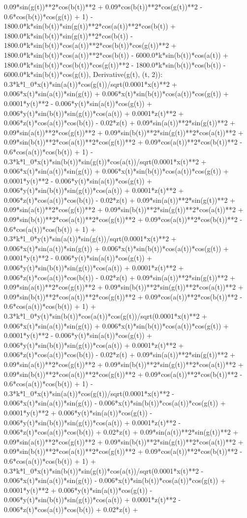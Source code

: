 0.09*sin(g(t))**2*cos(b(t))**2 + 0.09*cos(b(t))**2*cos(g(t))**2 - 0.6*cos(b(t))*cos(g(t)) + 1) - 1800.0*k*sin(b(t))*sin(g(t))**2*cos(a(t))**2*cos(b(t)) + 1800.0*k*sin(b(t))*sin(g(t))**2*cos(b(t)) - 1800.0*k*sin(b(t))*cos(a(t))**2*cos(b(t))*cos(g(t))**2 + 1800.0*k*sin(b(t))*cos(a(t))**2*cos(b(t)) - 6000.0*k*sin(b(t))*cos(a(t)) + 1800.0*k*sin(b(t))*cos(b(t))*cos(g(t))**2 - 1800.0*k*sin(b(t))*cos(b(t)) - 6000.0*k*sin(b(t))*cos(g(t)), Derivative(g(t), (t, 2)): 0.3*k*l_0*x(t)*sin(a(t))*cos(g(t))/sqrt(0.0001*x(t)**2 + 0.006*x(t)*sin(a(t))*sin(g(t)) + 0.006*x(t)*sin(b(t))*cos(a(t))*cos(g(t)) + 0.0001*y(t)**2 - 0.006*y(t)*sin(a(t))*cos(g(t)) + 0.006*y(t)*sin(b(t))*sin(g(t))*cos(a(t)) + 0.0001*z(t)**2 + 0.006*z(t)*cos(a(t))*cos(b(t)) - 0.02*z(t) + 0.09*sin(a(t))**2*sin(g(t))**2 + 0.09*sin(a(t))**2*cos(g(t))**2 + 0.09*sin(b(t))**2*sin(g(t))**2*cos(a(t))**2 + 0.09*sin(b(t))**2*cos(a(t))**2*cos(g(t))**2 + 0.09*cos(a(t))**2*cos(b(t))**2 - 0.6*cos(a(t))*cos(b(t)) + 1) - 0.3*k*l_0*x(t)*sin(b(t))*sin(g(t))*cos(a(t))/sqrt(0.0001*x(t)**2 + 0.006*x(t)*sin(a(t))*sin(g(t)) + 0.006*x(t)*sin(b(t))*cos(a(t))*cos(g(t)) + 0.0001*y(t)**2 - 0.006*y(t)*sin(a(t))*cos(g(t)) + 0.006*y(t)*sin(b(t))*sin(g(t))*cos(a(t)) + 0.0001*z(t)**2 + 0.006*z(t)*cos(a(t))*cos(b(t)) - 0.02*z(t) + 0.09*sin(a(t))**2*sin(g(t))**2 + 0.09*sin(a(t))**2*cos(g(t))**2 + 0.09*sin(b(t))**2*sin(g(t))**2*cos(a(t))**2 + 0.09*sin(b(t))**2*cos(a(t))**2*cos(g(t))**2 + 0.09*cos(a(t))**2*cos(b(t))**2 - 0.6*cos(a(t))*cos(b(t)) + 1) + 0.3*k*l_0*y(t)*sin(a(t))*sin(g(t))/sqrt(0.0001*x(t)**2 + 0.006*x(t)*sin(a(t))*sin(g(t)) + 0.006*x(t)*sin(b(t))*cos(a(t))*cos(g(t)) + 0.0001*y(t)**2 - 0.006*y(t)*sin(a(t))*cos(g(t)) + 0.006*y(t)*sin(b(t))*sin(g(t))*cos(a(t)) + 0.0001*z(t)**2 + 0.006*z(t)*cos(a(t))*cos(b(t)) - 0.02*z(t) + 0.09*sin(a(t))**2*sin(g(t))**2 + 0.09*sin(a(t))**2*cos(g(t))**2 + 0.09*sin(b(t))**2*sin(g(t))**2*cos(a(t))**2 + 0.09*sin(b(t))**2*cos(a(t))**2*cos(g(t))**2 + 0.09*cos(a(t))**2*cos(b(t))**2 - 0.6*cos(a(t))*cos(b(t)) + 1) + 0.3*k*l_0*y(t)*sin(b(t))*cos(a(t))*cos(g(t))/sqrt(0.0001*x(t)**2 + 0.006*x(t)*sin(a(t))*sin(g(t)) + 0.006*x(t)*sin(b(t))*cos(a(t))*cos(g(t)) + 0.0001*y(t)**2 - 0.006*y(t)*sin(a(t))*cos(g(t)) + 0.006*y(t)*sin(b(t))*sin(g(t))*cos(a(t)) + 0.0001*z(t)**2 + 0.006*z(t)*cos(a(t))*cos(b(t)) - 0.02*z(t) + 0.09*sin(a(t))**2*sin(g(t))**2 + 0.09*sin(a(t))**2*cos(g(t))**2 + 0.09*sin(b(t))**2*sin(g(t))**2*cos(a(t))**2 + 0.09*sin(b(t))**2*cos(a(t))**2*cos(g(t))**2 + 0.09*cos(a(t))**2*cos(b(t))**2 - 0.6*cos(a(t))*cos(b(t)) + 1) - 0.3*k*l_0*x(t)*sin(a(t))*cos(g(t))/sqrt(0.0001*x(t)**2 - 0.006*x(t)*sin(a(t))*sin(g(t)) - 0.006*x(t)*sin(b(t))*cos(a(t))*cos(g(t)) + 0.0001*y(t)**2 + 0.006*y(t)*sin(a(t))*cos(g(t)) - 0.006*y(t)*sin(b(t))*sin(g(t))*cos(a(t)) + 0.0001*z(t)**2 - 0.006*z(t)*cos(a(t))*cos(b(t)) + 0.02*z(t) + 0.09*sin(a(t))**2*sin(g(t))**2 + 0.09*sin(a(t))**2*cos(g(t))**2 + 0.09*sin(b(t))**2*sin(g(t))**2*cos(a(t))**2 + 0.09*sin(b(t))**2*cos(a(t))**2*cos(g(t))**2 + 0.09*cos(a(t))**2*cos(b(t))**2 - 0.6*cos(a(t))*cos(b(t)) + 1) + 0.3*k*l_0*x(t)*sin(b(t))*sin(g(t))*cos(a(t))/sqrt(0.0001*x(t)**2 - 0.006*x(t)*sin(a(t))*sin(g(t)) - 0.006*x(t)*sin(b(t))*cos(a(t))*cos(g(t)) + 0.0001*y(t)**2 + 0.006*y(t)*sin(a(t))*cos(g(t)) - 0.006*y(t)*sin(b(t))*sin(g(t))*cos(a(t)) + 0.0001*z(t)**2 - 0.006*z(t)*cos(a(t))*cos(b(t)) + 0.02*z(t) + 